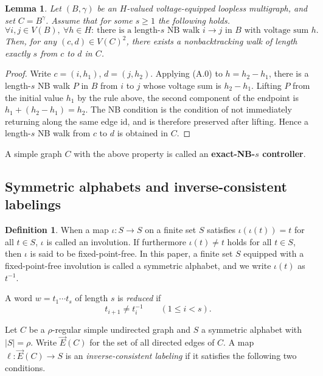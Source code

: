 \documentclass[11pt]{article}
\newtheorem{lemma}[theorem]{Lemma}
\theoremstyle{definition}
\newtheorem{definition}[theorem]{Definition}
\theoremstyle{remark}
\renewcommand{\_}{\textunderscore\allowbreak}
\begin{document}
\begin{lemma}\label{lem:coset}
Let \((B,\gamma)\) be an \(H\)-valued
voltage-equipped loopless multigraph, and set \(C=B^\gamma\). Assume
that for some \(s\ge1\) the following holds. \[
\tag{A.0}
  \forall i,j\in V(B),\ \forall h\in H:\ 
  \text{there is a length-}s\text{ NB walk }i\to j\text{ in }B\text{ with voltage sum }h.
\] Then, for any \((c,d)\in V(C)^2\), there exists a nonbacktracking
walk of length exactly \(s\) from \(c\) to \(d\) in \(C\).
\end{lemma}

\begin{proof}
Write \(c=(i,h_1)\), \(d=(j,h_2)\). Applying (A.0) to
\(h=h_2-h_1\), there is a length-\(s\) NB walk \(P\) in \(B\) from \(i\)
to \(j\) whose voltage sum is \(h_2-h_1\). Lifting \(P\) from the
initial value \(h_1\) by the rule above, the second component of the
endpoint is \(h_1+(h_2-h_1)=h_2\). The NB condition is the condition of
not immediately returning along the same edge id, and is therefore
preserved after lifting. Hence a length-\(s\) NB walk from \(c\) to
\(d\) is obtained in \(C\).
\end{proof}

A simple graph \(C\) with the above property is called an
\textbf{exact-NB-\(s\) controller}.

\subsection{Symmetric alphabets and inverse-consistent
labelings}\label{a.3-symmetric-alphabets-and-inverse-consistent-labelings}

\begin{definition}\label{def:symmalpha}
When a map \(\iota:S\to S\) on a finite set
\(S\) satisfies \(\iota(\iota(t))=t\) for all \(t\in S\), \(\iota\) is
called an involution. If furthermore \(\iota(t)\ne t\) holds for all
\(t\in S\), then \(\iota\) is said to be fixed-point-free. In this
paper, a finite set \(S\) equipped with a fixed-point-free involution is
called a symmetric alphabet, and we write \(\iota(t)\) as \(t^{-1}\).
\end{definition}

A word \(w=t_1\cdots t_s\) of length \(s\) is \emph{reduced} if \[
  t_{i+1}\ne t_i^{-1}\qquad(1\le i<s).
\]

Let \(C\) be a \(\rho\)-regular simple undirected graph and \(S\) a
symmetric alphabet with \(|S|=\rho\). Write \(\overrightarrow E(C)\) for
the set of all directed edges of \(C\). A map
\(\ell:\overrightarrow E(C)\to S\) is an \emph{inverse-consistent
labeling} if it satisfies the following two conditions.
\end{document}
